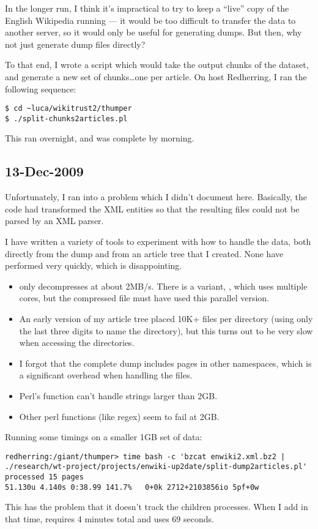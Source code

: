 In the longer run, I think it's impractical to try to keep a ``live''
copy of the English Wikipedia running --- it would be too difficult
to transfer the data to another server, so it would only be useful
for generating dumps.
But then, why not just generate dump files directly?

To that end, I wrote a script which would take the 
output chunks of the \enwiki dataset, and generate a new set
of chunks\ldots one per article.
On host Redherring, I ran the following sequence:
\begin{verbatim}
$ cd ~luca/wikitrust2/thumper
$ ./split-chunks2articles.pl
\end{verbatim}
This ran overnight, and was complete by morning.

\subsection{13-Dec-2009}

Unfortunately, I ran into a problem which I didn't document here.
Basically, the  code had transformed the XML entities
so that the resulting files could not be parsed by an XML parser.

I have written a variety of tools to experiment with how to handle the data,
both directly from the dump and from an article tree that I created.
None have performed very quickly, which is disappointing.
\begin{itemize}
\item {} only decompresses at about 2MB/s.
	There is a variant, , which uses multiple cores,
	but the compressed file must have used this parallel version.
\item An early version of my article tree placed 10K+ files per directory
	(using only the last three digits to name the directory),
	but this turns out to be very slow when accessing the directories.
\item I forgot that the complete dump includes pages in other namespaces,
	which is a significant overhead when handling the files.
\item Perl's  function can't handle strings larger than 2GB.
\item Other perl functions (like regex) seem to fail at 2GB.
\end{itemize}

Running some timings on a smaller 1GB set of data:
\begin{verbatim}
redherring:/giant/thumper> time bash -c 'bzcat enwiki2.xml.bz2 | ./research/wt-project/projects/enwiki-up2date/split-dump2articles.pl'
processed 15 pages
51.130u 4.140s 0:38.99 141.7%   0+0k 2712+2103856io 5pf+0w
\end{verbatim}
This has the problem that it doesn't track the children processes.
When I add in that time,  requires 4 minutes total
and  uses 69 seconds.

